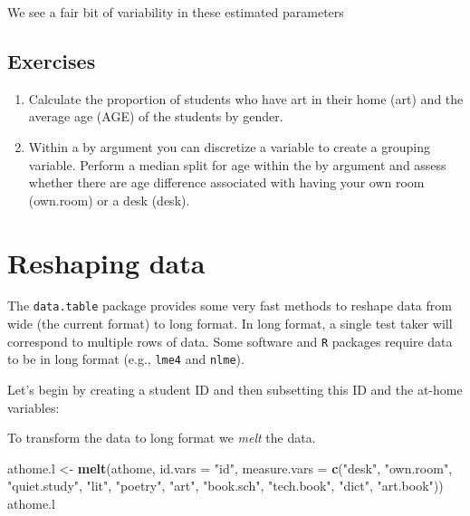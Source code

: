 \documentclass[]{book}
\newenvironment{Shaded}{\begin{snugshade}}{\end{snugshade}}
\newcommand{\DataTypeTok}[1]{\textcolor[rgb]{0.13,0.29,0.53}{#1}}
\newcommand{\DecValTok}[1]{\textcolor[rgb]{0.00,0.00,0.81}{#1}}
\newcommand{\KeywordTok}[1]{\textcolor[rgb]{0.13,0.29,0.53}{\textbf{#1}}}
\newcommand{\NormalTok}[1]{#1}
\newcommand{\OperatorTok}[1]{\textcolor[rgb]{0.81,0.36,0.00}{\textbf{#1}}}
\newcommand{\StringTok}[1]{\textcolor[rgb]{0.31,0.60,0.02}{#1}}
\begin{document}
We see a fair bit of variability in these estimated parameters

\hypertarget{exercises-3}{%
\subsection{Exercises}\label{exercises-3}}

\begin{enumerate}
\def\labelenumi{\arabic{enumi}.}
\item
  Calculate the proportion of students who have art in their home (art) and the average age (AGE) of the students by gender.
\item
  Within a by argument you can discretize a variable to create a grouping variable. Perform a median split for age within the by argument and assess whether there are age difference associated with having your own room (own.room) or a desk (desk).
\end{enumerate}

\hypertarget{reshaping-data}{%
\section{Reshaping data}\label{reshaping-data}}

The \texttt{data.table} package provides some very fast methods to reshape data from wide (the current format) to long format. In long format, a single test taker will correspond to multiple rows of data. Some software and \texttt{R} packages require data to be in long format (e.g., \texttt{lme4} and \texttt{nlme}).

Let's begin by creating a student ID and then subsetting this ID and the at-home variables:

\begin{Shaded}
\end{Shaded}

To transform the data to long format we \emph{melt} the data.

\begin{Shaded}
\begin{Highlighting}[]
\NormalTok{athome.l <-}\StringTok{ }\KeywordTok{melt}\NormalTok{(athome, }
                 \DataTypeTok{id.vars =} \StringTok{"id"}\NormalTok{,}
                 \DataTypeTok{measure.vars =} \KeywordTok{c}\NormalTok{(}\StringTok{"desk"}\NormalTok{, }\StringTok{"own.room"}\NormalTok{, }\StringTok{"quiet.study"}\NormalTok{, }\StringTok{"lit"}\NormalTok{,}
                                  \StringTok{"poetry"}\NormalTok{, }\StringTok{"art"}\NormalTok{, }\StringTok{"book.sch"}\NormalTok{, }\StringTok{"tech.book"}\NormalTok{,}
                                  \StringTok{"dict"}\NormalTok{, }\StringTok{"art.book"}\NormalTok{))}
\NormalTok{athome.l}
\end{Highlighting}
\end{Shaded}
\end{document}
